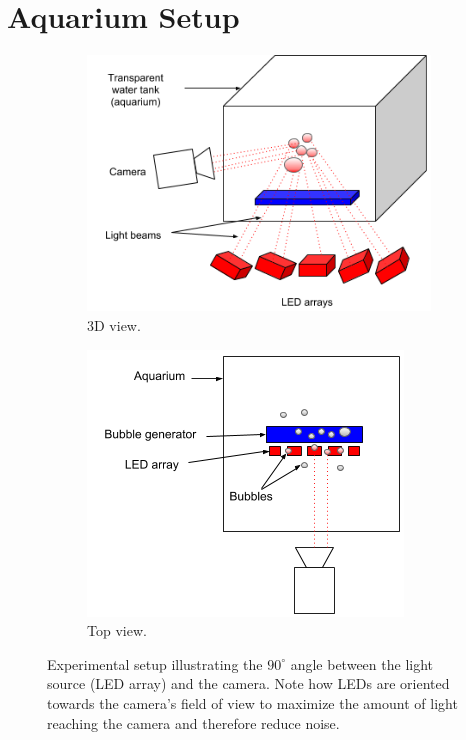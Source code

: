 	
		
	\section{Aquarium Setup}\label{aquarium_setup}
		\begin{figure}
			\begin{subfigure}[t]{.5\textwidth}
				\includegraphics[scale=.6]{images/aquarium_setup.png}
				\caption{3D view.}
			\end{subfigure}\hfill
			\begin{subfigure}[t]{.4\textwidth}
				\includegraphics[scale=.6]{images/aquarium_setup_above.png}
				\caption{Top view.}
				\label{subfig:aquarium_setup_above}
			\end{subfigure}
			\caption{Experimental setup illustrating the $90^\circ$ angle between the light source (LED array) and the camera. Note how LEDs are oriented towards the camera's field of view to maximize the amount of light reaching the camera and therefore reduce noise.}
			\label{fig:aquarium_setup}
		\end{figure}			
		
